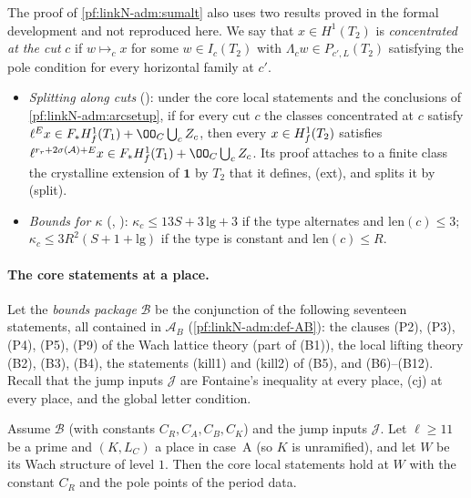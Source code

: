 \begin{remark}\label{pf:linkN-adm:arcs}
The proof of \cref{pf:linkN-adm:sumalt} also uses two results proved in the formal development and not reproduced here.
We say that $x\in H^1(T_2)$ is \emph{concentrated at the cut} $c$ if $w\mapsto_cx$ for some $w\in I_c(T_2)$ with
$\Lambda_cw\in P_{c',L}(T_2)$ satisfying the pole condition for every horizontal family at $c'$.
\begin{itemize}
\item[(A4)] \emph{Splitting along cuts} (): under the core local
  statements and the conclusions of \cref{pf:linkN-adm:arcsetup}, if for every cut $c$ the classes concentrated at $c$
  satisfy $\ell^Ex\in F_*\linkNadmHf(T_1)+\OO_C\bigcup_cZ_c$, then every $x\in H^1_{f}(T_2)$ satisfies
  $\ell^{r_r+2\sigma(\mathcal A)+E}x\in F_*\linkNadmHf(T_1)+\OO_C\bigcup_cZ_c$. Its proof attaches to a finite class the
  crystalline extension of $\mathbf 1$ by $T_2$ that it defines, (ext), and splits it by (split).
\item[(A5)] \emph{Bounds for $\kappa$} (,
  ): $\kappa_c\le13S+3\,\mathrm{lg}+3$ if the type alternates
  and $\mathrm{len}(c)\le3$; $\kappa_c\le3R^2(S+1+\mathrm{lg})$ if the type is constant and $\mathrm{len}(c)\le R$.
\end{itemize}
\end{remark}

\paragraph{The core statements at a place.}
Let the \emph{bounds package} $\mathcal B$ be the conjunction of the following seventeen statements, all contained in
$\mathcal A_B$ (\cref{pf:linkN-adm:def-AB}): the clauses (P2), (P3), (P4), (P5), (P9) of the Wach lattice theory (part of
(B1)), the local lifting theory (B2), (B3), (B4), the statements (kill1) and (kill2) of (B5), and (B6)--(B12). Recall that
the jump inputs $\mathcal J$ are Fontaine's inequality at every place, (cj) at every place, and the global letter condition.

\begin{proposition}\label{pf:linkN-adm:cores}
Assume $\mathcal B$ (with constants $C_R,C_A,C_B,C_K$) and the jump inputs $\mathcal J$. Let $\ell\ge11$ be a prime and $(K,L_C)$ a place
in case~A (so $K$ is unramified), and let $W$ be its Wach structure of level $1$. Then the core local statements hold
at $W$ with the constant $C_R$ and the pole points of the period data.
\end{proposition}

